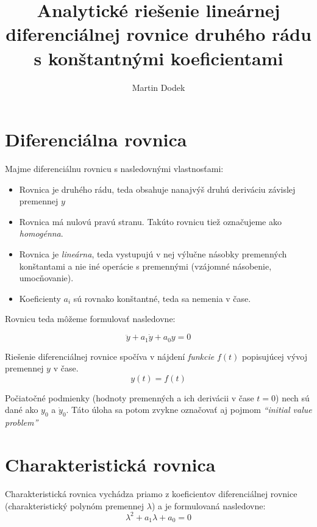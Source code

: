 \documentclass[a4paper,10pt]{article}
\begin{document}
\title{Analytické riešenie lineárnej diferenciálnej rovnice druhého rádu s konštantnými koeficientami}
\author{Martin Dodek}
\pagestyle{plain}
\maketitle

\section{Diferenciálna rovnica}
Majme diferenciálnu rovnicu s nasledovnými vlastnosťami:
\begin{itemize}
 \item Rovnica je druhého rádu, teda obsahuje nanajvýš druhú deriváciu závislej premennej $y$
 \item Rovnica má nulovú pravú stranu. Takúto rovnicu tiež označujeme ako \emph{homogénna}.
 \item Rovnica je \emph{lineárna}, teda vystupujú v nej výlučne násobky premenných konštantami a nie iné operácie s premennými (vzájomné násobenie, umocňovanie).
 \item Koeficienty $a_i$ sú rovnako konštantné, teda sa nemenia v čase.
\end{itemize}

Rovnicu teda môžeme formulovať nasledovne:

\begin{equation}
\label{eq:diff_eq}
\ddot{y}+a_1\dot{y}+a_0y=0
\end{equation}

Riešenie diferenciálnej rovnice spočíva v nájdení \emph{funkcie} $f(t)$ popisujúcej vývoj premennej $y$ v čase.
\begin{equation*}
	y(t)=f(t)
\end{equation*}

Počiatočné podmienky (hodnoty premenných a ich derivácii v čase $t=0$) nech sú dané ako $y_0$ a $\dot{y}_0$.
Táto úloha sa potom zvykne označovať aj pojmom \emph{``initial value problem''} 

\section{Charakteristická rovnica}

Charakteristická rovnica vychádza priamo z koeficientov diferenciálnej rovnice (charakteristický polynóm premennej $\lambda$) a je formulovaná nasledovne:
\begin{equation}
\label{eq:charakteristická rovnica}
	\lambda^2+a_1\lambda+a_0=0
\end{equation}
\end{document}
